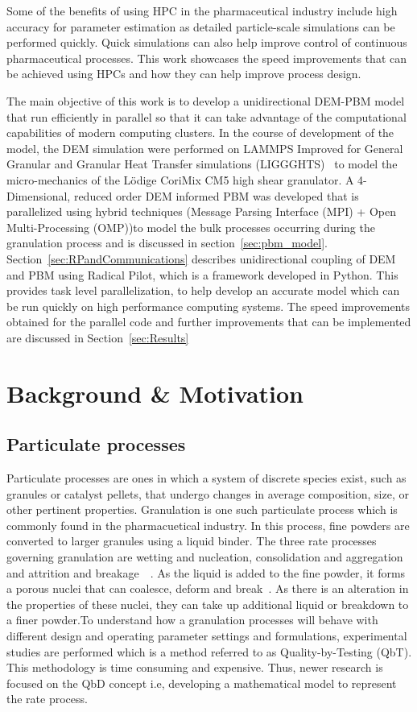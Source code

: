 \documentclass[preprint,11pt,authoryear]{elsarticle}
\begin{document}
Some of the benefits of using HPC in the pharmaceutical industry include high accuracy for 
parameter estimation as detailed particle-scale simulations can be performed quickly. 
Quick simulations can also help improve control of continuous pharmaceutical processes. 
This work showcases the speed improvements that can be achieved using HPCs and how 
they can help improve process design.

The main objective of this work is to develop a unidirectional DEM-PBM model that run efficiently in 
parallel so that it can take advantage of the computational capabilities of  modern computing 
clusters. In the course of development of the model, the DEM simulation were performed on 
LAMMPS Improved for General Granular and Granular Heat Transfer simulations (LIGGGHTS)~\citep{Kloss2012} to  
model the micro-mechanics of the L\"{o}dige CoriMix CM5 high shear granulator. A 4-Dimensional, 
reduced order DEM informed PBM was developed that is parallelized using hybrid techniques 
(Message Parsing Interface (MPI) + Open Multi-Processing (OMP))to model the bulk processes occurring during the granulation process and 
is discussed in section~\ref{sec:pbm_model}. Section~\ref{sec:RPandCommunications} describes 
unidirectional coupling of DEM and PBM using Radical Pilot, which is a 
framework developed in Python. This provides task level parallelization, to help develop 
an accurate model which can be run quickly on high performance computing systems. The speed
improvements obtained for the parallel code and further improvements that can be 
implemented are discussed in Section~\ref{sec:Results}


\section{Background \& Motivation}

\subsection{Particulate processes}
Particulate processes are ones in which a system of discrete species exist, such as granules 
or catalyst pellets, that undergo changes in average composition, size, or other pertinent 
properties. Granulation is one such particulate process which is commonly found in the 
pharmacuetical industry. In this process, fine powders are converted to larger granules 
using a liquid binder. The three rate processes governing granulation are wetting and 
nucleation, consolidation and aggregation and attrition and breakage~\citep{Iveson2001}~\citep{Cameron2005}. 
As the liquid is added to the fine powder, it 
forms a porous nuclei that can coalesce, deform and break~\citep{Barrasso2015ces}. As there is an 
alteration in the properties of these nuclei, they can take up additional liquid or breakdown to a 
finer powder.To understand how a granulation processes will behave with different design and operating 
parameter settings and formulations, experimental studies are performed which is a method referred 
to as Quality-by-Testing (QbT). This methodology is time consuming and 
expensive. Thus, newer research is focused on the QbD concept i.e, 
developing a mathematical model to represent the rate process.
\end{document}
